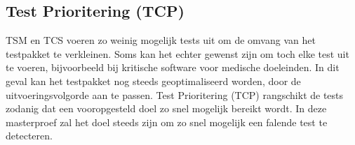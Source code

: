 \noindent{}

\subsection{Test Prioritering (TCP)}
\noindent TSM en TCS voeren zo weinig mogelijk tests uit om de omvang van het testpakket te verkleinen. Soms kan het echter gewenst zijn om toch elke test uit te voeren, bijvoorbeeld bij kritische software voor medische doeleinden. In dit geval kan het testpakket nog steeds geoptimaliseerd worden, door de uitvoeringsvolgorde aan te passen. Test Prioritering (TCP) \cite{10.1002/stv.430} rangschikt de tests zodanig dat een vooropgesteld doel zo snel mogelijk bereikt wordt. In deze masterproef zal het doel steeds zijn om zo snel mogelijk een falende test te detecteren.\\


\noindent{}